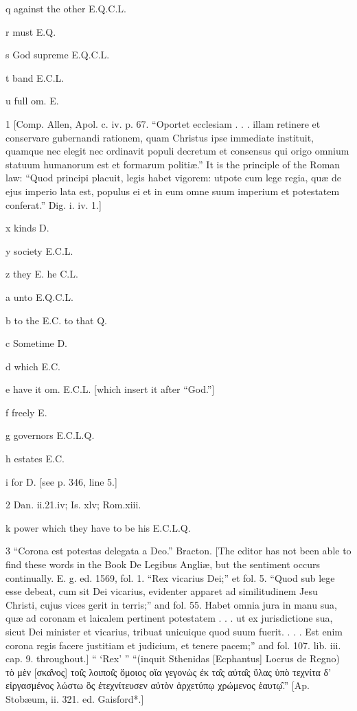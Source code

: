 q
against the other E.Q.C.L.

r
must E.Q.

s
God supreme E.Q.C.L.

t
band E.C.L.

u
full om. E.

1
[Comp. Allen, Apol. c. iv. p. 67. “Oportet ecclesiam . . . illam retinere et conservare gubernandi rationem, quam Christus ipse immediate instituit, quamque nec elegit nec ordinavit populi decretum et consensus qui origo omnium statuum humanorum est et formarum politiæ.” It is the principle of the Roman law: “Quod principi placuit, legis habet vigorem: utpote cum lege regia, quæ de ejus imperio lata est, populus ei et in eum omne suum imperium et potestatem conferat.” Dig. i. iv. 1.]

x
kinds D.

y
society E.C.L.

z
they E. he C.L.

a
unto E.Q.C.L.

b
to the E.C. to that Q.

c
Sometime D.

d
which E.C.

e
have it om. E.C.L. [which insert it after “God.”]

f
freely E.

g
governors E.C.L.Q.

h
estates E.C.

i
for D. [see p. 346, line 5.]

2
Dan. ii.21.iv; Is. xlv; Rom.xiii.

k
power which they have to be his E.C.L.Q.

3
“Corona est potestas delegata a Deo.” Bracton. [The editor has not been able to find these words in the Book De Legibus Angliæ, but the sentiment occurs continually. E. g. ed. 1569, fol. 1. “Rex vicarius Dei;” et fol. 5. “Quod sub lege esse debeat, cum sit Dei vicarius, evidenter apparet ad similitudinem Jesu Christi, cujus vices gerit in terris;” and fol. 55. Habet omnia jura in manu sua, quæ ad coronam et laicalem pertinent potestatem . . . ut ex jurisdictione sua, sicut Dei minister et vicarius, tribuat unicuique quod suum fuerit. . . . Est enim corona regis facere justitiam et judicium, et tenere pacem;” and fol. 107. lib. iii. cap. 9. throughout.] “ ‘Rex’ ” “(inquit Sthenidas [Ecphantus] Locrus de Regno) τὸ μὲν [σκα̑νος] τοι̑ς λοιποι̑ς ὅμοιος οἵα γεγονὼς ἐκ τα̑ς αὐτα̑ς ὕλας ὑπὸ τεχνίτα δ’ εἰργασμένος λώστω ὃς ἐτεχνίτευσεν αὐτὸν ἀρχετύπῳ χρώμενος ἑαυτῳ̑.” [Ap. Stobæum, ii. 321. ed. Gaisford*.]

